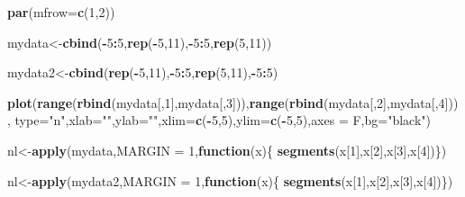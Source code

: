 \documentclass[
]{book}
\newenvironment{Shaded}{\begin{snugshade}}{\end{snugshade}}
\newcommand{\ControlFlowTok}[1]{\textcolor[rgb]{0.13,0.29,0.53}{\textbf{#1}}}
\newcommand{\DataTypeTok}[1]{\textcolor[rgb]{0.13,0.29,0.53}{#1}}
\newcommand{\DecValTok}[1]{\textcolor[rgb]{0.00,0.00,0.81}{#1}}
\newcommand{\KeywordTok}[1]{\textcolor[rgb]{0.13,0.29,0.53}{\textbf{#1}}}
\newcommand{\NormalTok}[1]{#1}
\newcommand{\OperatorTok}[1]{\textcolor[rgb]{0.81,0.36,0.00}{\textbf{#1}}}
\newcommand{\StringTok}[1]{\textcolor[rgb]{0.31,0.60,0.02}{#1}}
\theoremstyle{definition}
\theoremstyle{definition}
\theoremstyle{definition}
\theoremstyle{remark}
\begin{document}
\begin{Shaded}
\begin{Highlighting}[]
\KeywordTok{par}\NormalTok{(}\DataTypeTok{mfrow=}\KeywordTok{c}\NormalTok{(}\DecValTok{1}\NormalTok{,}\DecValTok{2}\NormalTok{))}



\NormalTok{mydata<-}\KeywordTok{cbind}\NormalTok{(}\OperatorTok{-}\DecValTok{5}\OperatorTok{:}\DecValTok{5}\NormalTok{,}\KeywordTok{rep}\NormalTok{(}\OperatorTok{-}\DecValTok{5}\NormalTok{,}\DecValTok{11}\NormalTok{),}\OperatorTok{-}\DecValTok{5}\OperatorTok{:}\DecValTok{5}\NormalTok{,}\KeywordTok{rep}\NormalTok{(}\DecValTok{5}\NormalTok{,}\DecValTok{11}\NormalTok{))}

\NormalTok{mydata2<-}\KeywordTok{cbind}\NormalTok{(}\KeywordTok{rep}\NormalTok{(}\OperatorTok{-}\DecValTok{5}\NormalTok{,}\DecValTok{11}\NormalTok{),}\OperatorTok{-}\DecValTok{5}\OperatorTok{:}\DecValTok{5}\NormalTok{,}\KeywordTok{rep}\NormalTok{(}\DecValTok{5}\NormalTok{,}\DecValTok{11}\NormalTok{),}\OperatorTok{-}\DecValTok{5}\OperatorTok{:}\DecValTok{5}\NormalTok{)}

\KeywordTok{plot}\NormalTok{(}\KeywordTok{range}\NormalTok{(}\KeywordTok{rbind}\NormalTok{(mydata[,}\DecValTok{1}\NormalTok{],mydata[,}\DecValTok{3}\NormalTok{])),}\KeywordTok{range}\NormalTok{(}\KeywordTok{rbind}\NormalTok{(mydata[,}\DecValTok{2}\NormalTok{],mydata[,}\DecValTok{4}\NormalTok{])),}
     \DataTypeTok{type=}\StringTok{"n"}\NormalTok{,}\DataTypeTok{xlab=}\StringTok{""}\NormalTok{,}\DataTypeTok{ylab=}\StringTok{""}\NormalTok{,}\DataTypeTok{xlim=}\KeywordTok{c}\NormalTok{(}\OperatorTok{-}\DecValTok{5}\NormalTok{,}\DecValTok{5}\NormalTok{),}\DataTypeTok{ylim=}\KeywordTok{c}\NormalTok{(}\OperatorTok{-}\DecValTok{5}\NormalTok{,}\DecValTok{5}\NormalTok{),}\DataTypeTok{axes =}\NormalTok{ F,}\DataTypeTok{bg=}\StringTok{"black"}\NormalTok{)}


\NormalTok{nl<-}\KeywordTok{apply}\NormalTok{(mydata,}\DataTypeTok{MARGIN =} \DecValTok{1}\NormalTok{,}\ControlFlowTok{function}\NormalTok{(x)\{}
  \KeywordTok{segments}\NormalTok{(x[}\DecValTok{1}\NormalTok{],x[}\DecValTok{2}\NormalTok{],x[}\DecValTok{3}\NormalTok{],x[}\DecValTok{4}\NormalTok{])\})}

\NormalTok{nl<-}\KeywordTok{apply}\NormalTok{(mydata2,}\DataTypeTok{MARGIN =} \DecValTok{1}\NormalTok{,}\ControlFlowTok{function}\NormalTok{(x)\{}
  \KeywordTok{segments}\NormalTok{(x[}\DecValTok{1}\NormalTok{],x[}\DecValTok{2}\NormalTok{],x[}\DecValTok{3}\NormalTok{],x[}\DecValTok{4}\NormalTok{])\})}



\end{Highlighting}
\end{Shaded}
\end{document}
